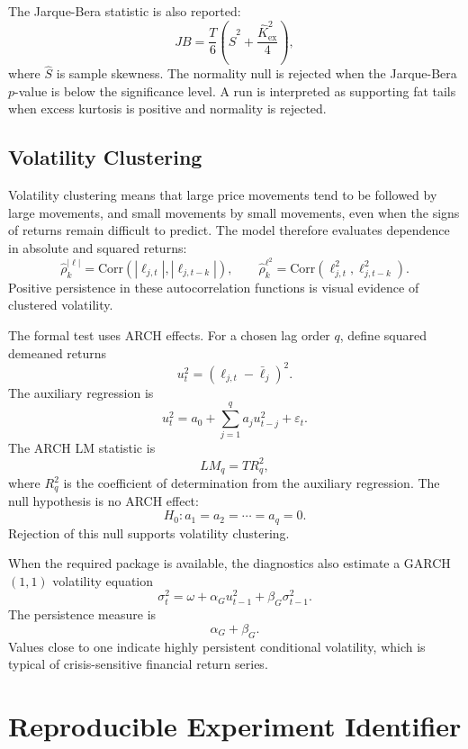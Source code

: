 \documentclass[12pt, a4paper]{article}
\begin{document}
    The Jarque-Bera statistic is also reported:
    \[
        JB
        =
        \frac{T}{6}
        \left(
            \widehat S^2+\frac{\widehat K_{\mathrm{ex}}^2}{4}
        \right),
    \]
    where \(\widehat S\) is sample skewness. The normality null is rejected when the
    Jarque-Bera \(p\)-value is below the significance level. A run is interpreted as
    supporting fat tails when excess kurtosis is positive and normality is rejected.

    \subsection{Volatility Clustering}

    Volatility clustering means that large price movements tend to be followed by
    large movements, and small movements by small movements, even when the signs of
    returns remain difficult to predict. The model therefore evaluates dependence in
    absolute and squared returns:
    \[
        \hat\rho_k^{|\ell|}
        =
        \mathrm{Corr}(|\ell_{j,t}|,|\ell_{j,t-k}|),
        \qquad
        \hat\rho_k^{\ell^2}
        =
        \mathrm{Corr}(\ell_{j,t}^2,\ell_{j,t-k}^2).
    \]
    Positive persistence in these autocorrelation functions is visual evidence of
    clustered volatility.

    The formal test uses ARCH effects. For a chosen lag order \(q\), define squared
    demeaned returns
    \[
        u_t^2={\left(\ell_{j,t}-\bar\ell_j\right)}^2.
    \]
    The auxiliary regression is
    \[
        u_t^2
        =
        a_0+\sum_{j=1}^{q}a_j u_{t-j}^2+\varepsilon_t.
    \]
    The ARCH LM statistic is
    \[
        LM_q=TR_q^2,
    \]
    where \(R_q^2\) is the coefficient of determination from the auxiliary
    regression. The null hypothesis is no ARCH effect:
    \[
        H_0:a_1=a_2=\cdots=a_q=0.
    \]
    Rejection of this null supports volatility clustering.

    When the required package is available, the diagnostics also estimate a
    GARCH \((1,1)\) volatility equation
    \[
        \sigma_t^2
        =
        \omega+\alpha_G u_{t-1}^2+\beta_G\sigma_{t-1}^2.
    \]
    The persistence measure is
    \[
        \alpha_G+\beta_G.
    \]
    Values close to one indicate highly persistent conditional volatility, which is
    typical of crisis-sensitive financial return series.

    \section{Reproducible Experiment Identifier}\label{sec:experiment_identifier}
\end{document}
